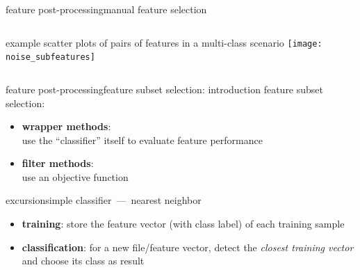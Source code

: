 		\begin{frame}{feature post-processing}{manual feature selection}
            \begin{columns}
                example scatter plots of pairs of features in a multi-class scenario
                    \texttt{[image: noise\_subfeatures]}
            \end{columns}
		\end{frame}
        
		\begin{frame}{feature post-processing}{feature subset selection: introduction}
			feature subset selection: 
			\begin{itemize}
				\item	\textbf{wrapper methods}:\\ use the ``classifier'' itself to evaluate feature performance
				\pause
				\item	\textbf{filter methods}:\\ use an objective function
			\end{itemize}
		\end{frame}

        \begin{frame}{excursion}{simple classifier~---~nearest neighbor}
            \begin{itemize}
                \item	    \textbf{training}: store the feature vector (with class label) of each training sample
                \item<2->	\textbf{classification}: for a new file/feature vector, detect the \textit{closest training vector} and choose its class as result
            \end{itemize}
            \vspace{-3mm}
        \end{frame}
        
